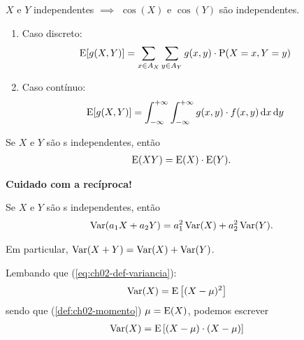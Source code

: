 \begin{example}    
    $X$ e $Y$ independentes $\implies$ $\cos(X)$ e $\cos(Y)$ são independentes.
\end{example}

\begin{result}
    \begin{enumerate}
        \item Caso discreto: \begin{align}
            \operatorname{E}[g(X, Y)] &= \sum_{x \in A_X} \sum_{y \in A_Y}
                g(x, y) \cdot \operatorname{P}(X = x, Y = y)
            \label{eq:ch03-esperanca-funcao-vetor-discreta}
        \end{align}
        \item Caso contínuo: \begin{align}
            \operatorname{E}[g(X, Y)] &= \int_{-\infty}^{+\infty} 
                \int_{-\infty}^{+\infty}
                    g(x, y) \cdot f(x, y)
                \,\mathrm{d} x
            \,\mathrm{d} y
            \label{eq:ch03-esperanca-funcao-vetor-continua}
        \end{align}
    \end{enumerate}
\end{result}

\begin{property}
    Se $X$ e $Y$ são \va s independentes, então
    \begin{align}
        \operatorname{E}(XY) = \operatorname{E}(X) \cdot \operatorname{E}(Y).
    \end{align}

    \begin{obs}
        \textbf{Cuidado com a recíproca!}
    \end{obs}
\end{property}

\begin{property}
    Se $X$ e $Y$ são \va s independentes, então
    \begin{align}
        \operatorname{Var}(a_1 X + a_2 Y) = a_1^2 \operatorname{Var}(X) + a_2^2\operatorname{Var}(Y).
    \end{align}

    Em particular, $\operatorname{Var}(X + Y) = \operatorname{Var}(X) + \operatorname{Var}(Y)$.
\end{property}

Lembando que (\cref{eq:ch02-def-variancia}):
\begin{align*}
    \operatorname{Var}(X) &= \operatorname{E}\left[(X-\mu)^2\right]
\end{align*}
sendo que (\cref{def:ch02-momento}) $\mu = \operatorname{E}(X)$, podemos escrever
\begin{align*}
    \operatorname{Var}(X) &= \operatorname{E}\left[(X-\mu)\cdot(X-\mu)\right]
\end{align*}

